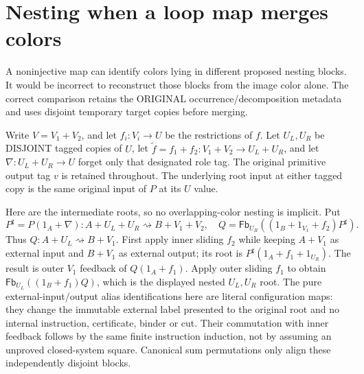 \documentclass[11pt]{article}
\begin{document}
\section{Nesting when a loop map merges colors}
A noninjective map can identify colors lying in different proposed nesting blocks. It would be incorrect to reconstruct those blocks from the image color alone. The correct comparison retains the ORIGINAL occurrence/decomposition metadata and uses disjoint temporary target copies before merging.

Write $V=V_1+V_2$, and let $f_i:V_i\to U$ be the restrictions of $f$. Let $U_L,U_R$ be DISJOINT tagged copies of $U$, let $\widetilde f=f_1+f_2:V_1+V_2\to U_L+U_R$, and let $\nabla:U_L+U_R\to U$ forget only that designated role tag. The original primitive output tag $v$ is retained throughout. The underlying root input at either tagged copy is the same original input of $P$ at its $U$ value.

Here are the intermediate roots, so no overlapping-color nesting is implicit. Put
\[
 P^{\sharp}=P(1_A+\nabla):A+U_L+U_R\rightsquigarrow B+V_1+V_2,
 \quad Q=\mathsf{Fb}_{U_R}((1_B+1_{V_1}+f_2)P^{\sharp}).
\]
Thus $Q:A+U_L\rightsquigarrow B+V_1$. First apply inner sliding $f_2$ while keeping $A+V_1$ as external input and $B+V_1$ as external output; its root is $P^{\sharp}(1_A+f_1+1_{U_R})$. The result is outer $V_1$ feedback of $Q(1_A+f_1)$. Apply outer sliding $f_1$ to obtain $\mathsf{Fb}_{U_L}((1_B+f_1)Q)$, which is the displayed nested $U_L,U_R$ root. The pure external-input/output alias identifications here are literal configuration maps: they change the immutable external label presented to the original root and no internal instruction, certificate, binder or cut. Their commutation with inner feedback follows by the same finite instruction induction, not by assuming an unproved closed-system square. Canonical sum permutations only align these independently disjoint blocks.
\end{document}
